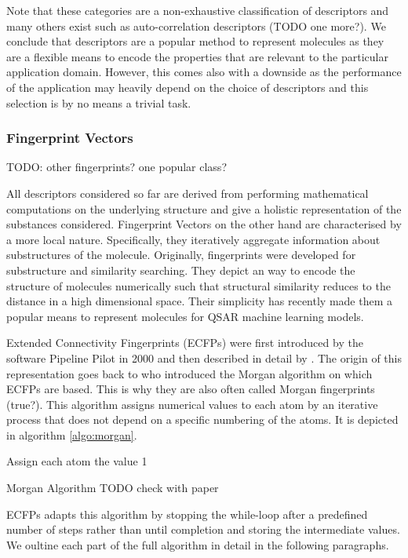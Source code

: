 Note that these categories are a non-exhaustive classification of descriptors and many others exist such as auto-correlation descriptors \citep{broto1984molecular} (TODO one more?). We conclude that descriptors are a popular method to represent molecules as they are a flexible means to encode the properties that are relevant to the particular application domain. However, this comes also with a downside as the performance of the application may heavily depend on the choice of descriptors and this selection is by no means a trivial task.

\subsubsection{Fingerprint Vectors}
TODO: other fingerprints? one popular class? 

All descriptors considered so far are derived from performing mathematical computations on the underlying structure and give a holistic representation of the substances considered. Fingerprint Vectors on the other hand are characterised by a more local nature. Specifically, they iteratively aggregate information about substructures of the molecule. Originally, fingerprints were developed for substructure and similarity searching. They depict an way to encode the structure of molecules numerically such that structural similarity reduces to the distance in a high dimensional space. Their simplicity has recently made them a popular means to represent molecules for QSAR machine learning models. 

Extended Connectivity Fingerprints (ECFPs) were first introduced by the software Pipeline Pilot in 2000 and then described in detail by \cite{ECFP}. The origin of this representation goes back to \cite{morgan} who introduced the Morgan algorithm on which ECFPs are based. This is why they are also often called Morgan fingerprints (true?). This algorithm assigns numerical values to each atom by an iterative process that does not depend on a specific numbering of the atoms. It is depicted in algorithm \ref{algo:morgan}.

\begin{algorithm}[t]
	\SetAlgoLined
	Assign each atom the value 1\;
	\caption{Morgan Algorithm TODO check with paper}
	\label{algo:morgan}
\end{algorithm}
ECFPs adapts this algorithm by stopping the while-loop after a predefined number of steps rather than until completion and storing the intermediate values. We oultine each part of the full algorithm in detail in the following paragraphs.

